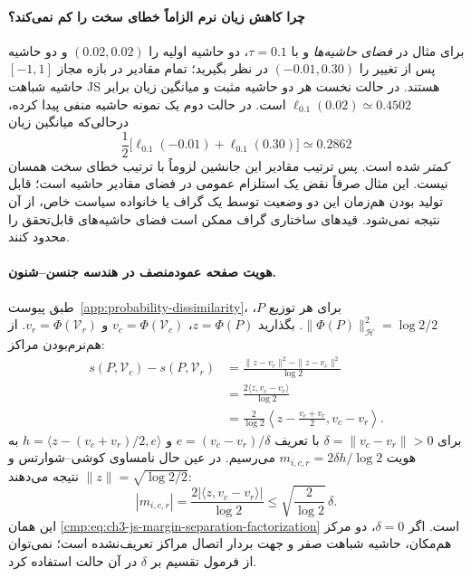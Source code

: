 \paragraph{چرا کاهش زیان نرم الزاماً خطای سخت را کم نمی‌کند؟}
برای مثال در \emph{فضای حاشیه‌ها}
و با $\tau=0.1$،
دو حاشیه اولیه را
$(0.02,0.02)$ و
دو حاشیه پس از تغییر را
$(-0.01,0.30)$ در نظر بگیرید؛
تمام مقادیر در بازه مجاز
$[-1,1]$ حاشیه شباهت JS هستند.
در حالت نخست هر دو حاشیه مثبت
و میانگین زیان برابر
$\ell_{0.1}(0.02)\simeq0.4502$ است.
در حالت دوم یک نمونه
حاشیه منفی پیدا کرده،
درحالی‌که میانگین زیان
\[
\frac12\bigl[
\ell_{0.1}(-0.01)+\ell_{0.1}(0.30)
\bigr]\simeq0.2862
\]
\emph{کمتر} شده است.
پس ترتیب مقادیر این جانشین
لزوماً با ترتیب خطای سخت
همسان نیست. این مثال صرفاً
نقض یک استلزام عمومی
در فضای مقادیر حاشیه است؛
قابل تولید بودن هم‌زمان
این دو وضعیت توسط
یک گراف یا خانواده سیاست
خاص، از آن نتیجه نمی‌شود.
قیدهای ساختاری گراف
ممکن است فضای حاشیه‌های
قابل‌تحقق را محدود کنند.

\paragraph{هویت صفحه عمودمنصف در هندسه جنسن--شنون.}
طبق پیوست~\ref{app:probability-dissimilarity}،
برای هر توزیع $P$،
$\|\Phi(P)\|_{\mathcal H}^2=\log2/2$.
بگذارید $z=\Phi(P)$،
$v_c=\Phi(\mathcal V_c)$ و
$v_r=\Phi(\mathcal V_r)$.
از هم‌نرم‌بودن مراکز:
\[
\begin{aligned}
s(P,\mathcal V_c)-s(P,\mathcal V_r)
&=\frac{\|z-v_r\|^2-\|z-v_c\|^2}{\log2}\\
&=\frac{2\langle z,v_c-v_r\rangle}{\log2}\\
&=\frac{2}{\log2}
\left\langle z-\frac{v_c+v_r}{2},
v_c-v_r\right\rangle.
\end{aligned}
\]
برای $\delta=\|v_c-v_r\|>0$
با تعریف
$e=(v_c-v_r)/\delta$
و $h=\langle z-(v_c+v_r)/2,e\rangle$
به هویت
$m_{i,c,r}=2\delta h/\log2$
می‌رسیم. در عین حال
نامساوی کوشی--شوارتس
و $\|z\|=\sqrt{\log2/2}$
نتیجه می‌دهند:
\[
|m_{i,c,r}|
=\frac{2|\langle z,v_c-v_r\rangle|}{\log2}
\le\sqrt{\frac2{\log2}}\,\delta.
\]
این همان
\eqref{cmp:eq:ch3-js-margin-separation-factorization}
است. اگر $\delta=0$،
دو مرکز هم‌مکان،
حاشیه شباهت صفر و
جهت بردار اتصال مراکز
تعریف‌نشده است؛
نمی‌توان از فرمول
تقسیم بر $\delta$
در آن حالت استفاده کرد.

